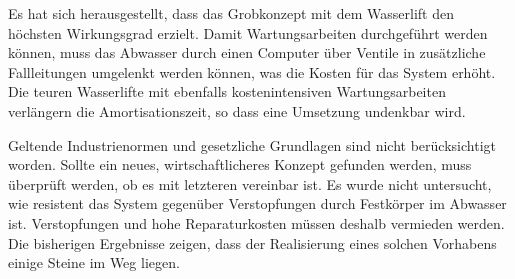 \documentclass[12pt]{article}
\begin{document}
Es hat sich herausgestellt, dass das Grobkonzept mit dem Wasserlift den höchsten Wirkungsgrad erzielt. Damit Wartungsarbeiten durchgeführt werden können, muss das Abwasser durch einen Computer über Ventile in zusätzliche Fallleitungen umgelenkt werden können, was die Kosten für das System erhöht. Die teuren Wasserlifte mit ebenfalls kostenintensiven Wartungsarbeiten verlängern die Amortisationszeit, so dass eine Umsetzung undenkbar wird. 


Geltende Industrienormen und gesetzliche Grundlagen sind nicht berücksichtigt worden. Sollte ein neues, wirtschaftlicheres Konzept gefunden werden, muss überprüft werden, ob es mit letzteren vereinbar ist. Es wurde nicht untersucht, wie resistent das System gegenüber Verstopfungen durch Festkörper im Abwasser ist. Verstopfungen und hohe Reparaturkosten müssen deshalb vermieden werden. Die bisherigen Ergebnisse zeigen, dass der Realisierung eines solchen Vorhabens einige Steine im Weg liegen. 
\end{document}
